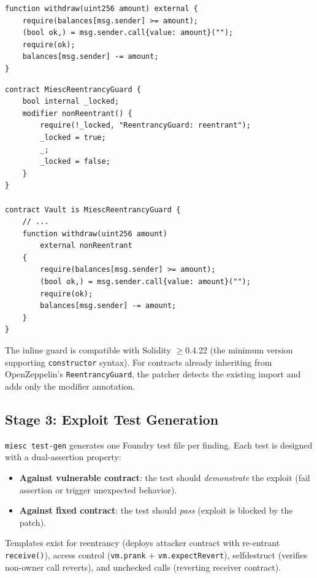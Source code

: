 \documentclass[conference]{IEEEtran}
\begin{document}
\begin{lstlisting}[caption={Vulnerable: external call before state update},label={lst:before},float=htbp]
function withdraw(uint256 amount) external {
    require(balances[msg.sender] >= amount);
    (bool ok,) = msg.sender.call{value: amount}("");
    require(ok);
    balances[msg.sender] -= amount;
}
\end{lstlisting}

\begin{lstlisting}[caption={Patched: inline reentrancy guard injected by MIESC},label={lst:after},float=htbp]
contract MiescReentrancyGuard {
    bool internal _locked;
    modifier nonReentrant() {
        require(!_locked, "ReentrancyGuard: reentrant");
        _locked = true;
        _;
        _locked = false;
    }
}

contract Vault is MiescReentrancyGuard {
    // ...
    function withdraw(uint256 amount)
        external nonReentrant
    {
        require(balances[msg.sender] >= amount);
        (bool ok,) = msg.sender.call{value: amount}("");
        require(ok);
        balances[msg.sender] -= amount;
    }
}
\end{lstlisting}

The inline guard is compatible with Solidity $\geq$0.4.22 (the minimum version supporting \texttt{constructor} syntax). For contracts already inheriting from OpenZeppelin's \texttt{ReentrancyGuard}, the patcher detects the existing import and adds only the modifier annotation.

\subsection{Stage 3: Exploit Test Generation}

\texttt{miesc test-gen} generates one Foundry test file per finding. Each test is designed with a dual-assertion property:

\begin{itemize}
    \item \textbf{Against vulnerable contract}: the test should \emph{demonstrate} the exploit (fail assertion or trigger unexpected behavior).
    \item \textbf{Against fixed contract}: the test should \emph{pass} (exploit is blocked by the patch).
\end{itemize}

Templates exist for reentrancy (deploys attacker contract with re-entrant \texttt{receive()}), access control (\texttt{vm.prank} + \texttt{vm.expectRevert}), selfdestruct (verifies non-owner call reverts), and unchecked calls (reverting receiver contract).
\end{document}
